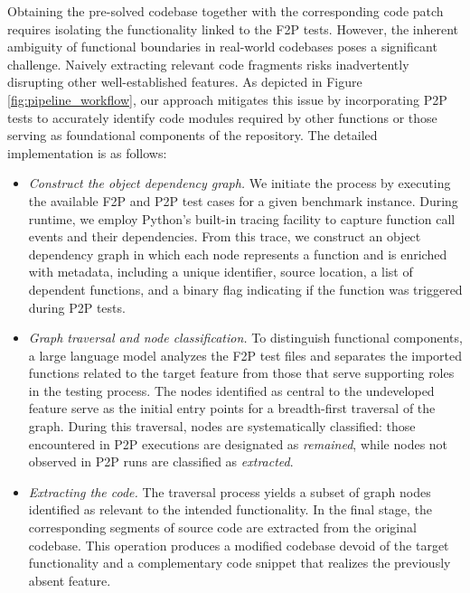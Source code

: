 \documentclass{article}
\newcommand{\myparagraph}[1]{\noindent{\bf #1}}
\begin{document}
\myparagraph{Test-Driven Code Patch Extraction.} Obtaining the pre-solved codebase together with the corresponding code patch requires isolating the functionality linked to the F2P tests. However, the inherent ambiguity of functional boundaries in real-world codebases poses a significant challenge. Naively extracting relevant code fragments risks inadvertently disrupting other well-established features. As depicted in Figure \ref{fig:pipeline_workflow}, our approach mitigates this issue by incorporating P2P tests to accurately identify code modules required by other functions or those serving as foundational components of the repository. The detailed implementation is as follows:
\begin{itemize}[leftmargin=12pt,itemindent=0pt]
    \setlength{\itemsep}{3pt}
    \setlength{\parsep}{0pt}
    \setlength{\parskip}{0pt}
    \item \textit{Construct the object dependency graph.} We initiate the process by executing the available F2P and P2P test cases for a given benchmark instance. During runtime, we employ Python’s built-in tracing facility to capture function call events and their dependencies.  From this trace, we construct an object dependency graph in which each node represents a function and is enriched with metadata, including a unique identifier, source location, a list of dependent functions, and a binary flag indicating if the function was triggered during P2P tests.
    \item \textit{Graph traversal and node classification.} To distinguish functional components, a large language model analyzes the F2P test files and separates the imported functions related to the target feature from those that serve supporting roles in the testing process. The nodes identified as central to the undeveloped feature serve as the initial entry points for a breadth-first traversal of the graph. During this traversal, nodes are systematically classified: those encountered in P2P executions are designated as \textit{remained}, while nodes not observed in P2P runs are classified as \textit{extracted}.
    \item \textit{Extracting the code.} The traversal process yields a subset of graph nodes identified as relevant to the intended functionality. In the final stage, the corresponding segments of source code are extracted from the original codebase. This operation produces a modified codebase devoid of the target functionality and a complementary code snippet that realizes the previously absent feature.
\end{itemize}
\end{document}
